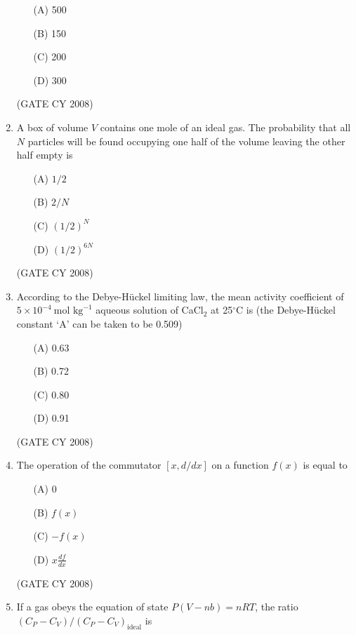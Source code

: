 \documentclass[12pt]{article}
\begin{document}
\begin{enumerate}
\begin{enumerate}
\item[(A)] 500
\item[(B)] 150
\item[(C)] 200
\item[(D)] 300
\end{enumerate}    \hfill{(GATE CY 2008)}




\item A box of volume $V$ contains one mole of an ideal gas. The probability that all $N$ particles will be found occupying one half of the volume leaving the other half empty is

\begin{enumerate}
\item[(A)] $1/2$
\item[(B)] $2/N$
\item[(C)] $(1/2)^N$
\item[(D)] $(1/2)^{6N}$
\end{enumerate}    \hfill{(GATE CY 2008)}




\item According to the Debye-Hückel limiting law, the mean activity coefficient of $5 \times 10^{-4}~\text{mol kg}^{-1}$ aqueous solution of CaCl$_2$ at 25$^\circ$C is (the Debye-Hückel constant ‘A’ can be taken to be 0.509)

\begin{enumerate}
\item[(A)] 0.63
\item[(B)] 0.72
\item[(C)] 0.80
\item[(D)] 0.91
\end{enumerate}    \hfill{(GATE CY 2008)}




\item The operation of the commutator $[x, d/dx]$ on a function $f(x)$ is equal to

\begin{enumerate}
\item[(A)] 0
\item[(B)] $f(x)$
\item[(C)] $-f(x)$
\item[(D)] $x \frac{df}{dx}$
\end{enumerate}    \hfill{(GATE CY 2008)}




\item If a gas obeys the equation of state $P (V - nb) = nRT$, the ratio $(C_P - C_V)/(C_P - C_V)_{\text{ideal}}$ is


\end{enumerate}
\end{document}
